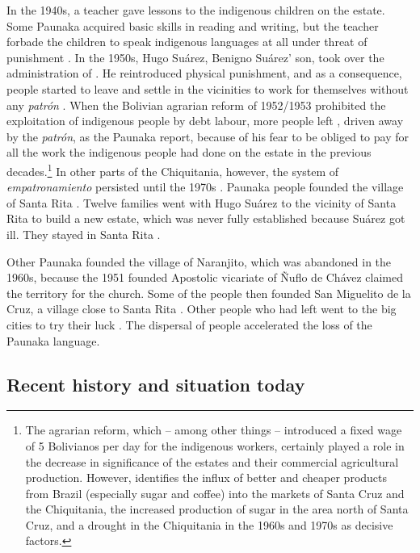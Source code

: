 In the 1940s, a teacher gave lessons to the indigenous children on the estate. Some Paunaka acquired basic skills in reading and writing, but the teacher forbade the children to speak indigenous languages at all under threat of punishment \citep[4]{Villalta2013}. In the 1950s, Hugo Suárez, Benigno Suárez’ son, took over the administration of . He reintroduced physical punishment, and as a consequence, people started to leave  and settle in the vicinities to work for themselves without any \textit{patrón} \citep[5]{Villalta2013}. When the Bolivian agrarian reform of 1952/1953 prohibited the exploitation of indigenous people by debt labour, more people left , driven away by the \textit{patrón}, as the Paunaka report, because of his fear to be obliged to pay for all the work the indigenous people had done on the estate in the previous decades.\footnote{The agrarian reform, which – among other things – introduced a fixed wage of 5 Bolivianos per day for the indigenous workers, certainly played a role in the decrease in significance of the estates and their commercial agricultural production. However, \citet[319, 332]{Tonelli2004} identifies the influx of better and cheaper products from Brazil (especially sugar and coffee) into the markets of Santa Cruz and the Chiquitania, the increased production of sugar in the area north of Santa Cruz, and a drought in the Chiquitania in the 1960s and 1970s as decisive factors.} In other parts of the Chiquitania, however, the system of \textit{empatronamiento} persisted until the 1970s \citep[300]{Tonelli2004}. Paunaka people founded the village of Santa Rita \citep[5]{Villalta2013}. Twelve families went with Hugo Suárez to the vicinity of Santa Rita to build a new estate, which was never fully established because Suárez got ill. They stayed in Santa Rita \citep[14]{Villalta2012}. 


Other Paunaka founded the village of Naranjito, which was abandoned in the 1960s, because the 1951 founded Apostolic vicariate of Ñuflo de Chávez claimed the territory for the church. Some of the people then founded San Miguelito de la Cruz, a village close to Santa Rita \citep[5]{Villalta2013}. Other people who had left  went to the big cities to try their luck \citep[14]{Villalta2012}. The dispersal of people accelerated the loss of the Paunaka language.



\subsection{Recent history and situation today}\label{sec:RecentHistory}

